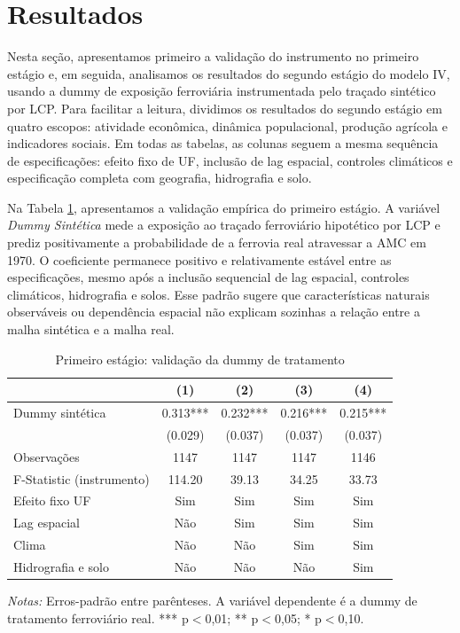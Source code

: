 \documentclass[12pt,a4paper]{article}
\begin{document}
\section{Resultados}

Nesta seção, apresentamos primeiro a validação do instrumento no primeiro estágio e, em seguida, analisamos os resultados do segundo estágio do modelo IV, usando a dummy de exposição ferroviária instrumentada pelo traçado sintético por LCP. Para facilitar a leitura, dividimos os resultados do segundo estágio em quatro escopos: atividade econômica, dinâmica populacional, produção agrícola e indicadores sociais. Em todas as tabelas, as colunas seguem a mesma sequência de especificações: efeito fixo de UF, inclusão de lag espacial, controles climáticos e especificação completa com geografia, hidrografia e solo.


Na Tabela \ref{tab:primeiro_estagio}, apresentamos a validação empírica do primeiro estágio. A variável \textit{Dummy Sintética} mede a exposição ao traçado ferroviário hipotético por LCP e prediz positivamente a probabilidade de a ferrovia real atravessar a AMC em 1970. O coeficiente permanece positivo e relativamente estável entre as especificações, mesmo após a inclusão sequencial de lag espacial, controles climáticos, hidrografia e solos. Esse padrão sugere que características naturais observáveis ou dependência espacial não explicam sozinhas a relação entre a malha sintética e a malha real.

\begin{table}[!htbp]
\centering
\scriptsize
\setlength{\tabcolsep}{3.5pt}
\renewcommand{\arraystretch}{0.80}
\caption{Primeiro estágio: validação da dummy de tratamento}
\label{tab:primeiro_estagio}
\begin{tabular}{lcccc}
\toprule
& (1) & (2) & (3) & (4) \\
\midrule
Dummy sintética & \num{0.313}*** & \num{0.232}*** & \num{0.216}*** & \num{0.215}*** \\
& (\num{0.029}) & (\num{0.037}) & (\num{0.037}) & (\num{0.037}) \\
Observações & 1147 & 1147 & 1147 & 1146 \\
F-Statistic (instrumento) & 114.20 & 39.13 & 34.25 & 33.73 \\
Efeito fixo UF & Sim & Sim & Sim & Sim \\
Lag espacial & Não & Sim & Sim & Sim \\
Clima & Não & Não & Sim & Sim \\
Hidrografia e solo & Não & Não & Não & Sim \\
\bottomrule
\end{tabular}
\begin{minipage}{0.95\textwidth}
\scriptsize \textit{Notas:} Erros-padrão entre parênteses. A variável dependente é a dummy de tratamento ferroviário real. *** p$<$0,01; ** p$<$0,05; * p$<$0,10.
\end{minipage}
\end{table}
\end{document}
